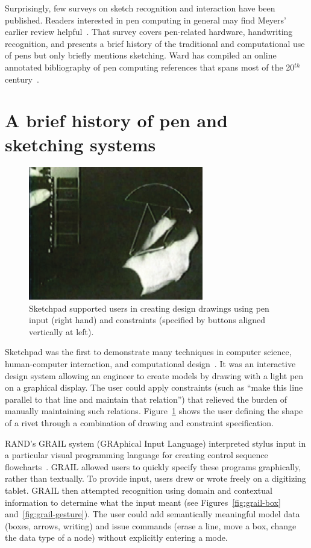 Surprisingly, few surveys on sketch recognition and interaction have
been published. Readers interested in pen computing in general may
find Meyers' earlier review helpful~\cite{meyer-pen-review}. That
survey covers pen-related hardware, handwriting recognition, and
presents a brief history of the traditional and computational use of
pens but only briefly mentions sketching. Ward has compiled an online
annotated bibliography of pen computing references that spans most of
the 20$^{th}$ century~\cite{ward-pen-bibliography}.

\section{A brief history of pen and sketching systems}
\label{sec:intro-brief-history}

\begin{figure}[]
   \centering
   \includegraphics[width=3in]{img/sketchpad.pdf} 
   \caption{Sketchpad supported users in creating design drawings
     using pen input (right hand) and constraints (specified by
     buttons aligned vertically at left).}
   \label{fig:sketchpad}
\end{figure}

Sketchpad was the first to demonstrate many techniques in computer
science, human-computer interaction, and computational
design~\cite{sutherland-sketchpad}. It was an interactive design
system allowing an engineer to create models by drawing with a light
pen on a graphical display. The user could apply constraints (such as
``make this line parallel to that line and maintain that relation'')
that relieved the burden of manually maintaining such
relations. Figure~\ref{fig:sketchpad} shows the user defining the
shape of a rivet through a combination of drawing and constraint
specification.

RAND's GRAIL system (GRAphical Input Language) interpreted stylus
input in a particular visual programming language for creating control
sequence flowcharts~\cite{ellis-grail}. GRAIL allowed users to quickly
specify these programs graphically, rather than textually. To provide
input, users drew or wrote freely on a digitizing tablet. GRAIL then
attempted recognition using domain and contextual information to
determine what the input meant (see Figures~\ref{fig:grail-box} and~\ref{fig:grail-gesture}). The user could add semantically meaningful
model data (boxes, arrows, writing) and issue commands (erase a line,
move a box, change the data type of a node) without explicitly
entering a mode.

